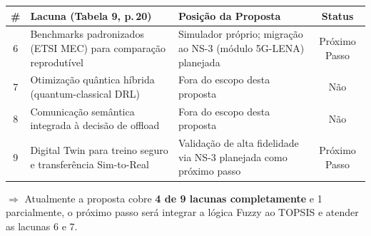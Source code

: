 \documentclass{beamer}
\begin{document}
{
\begin{frame}[plain, t]
\color{black}
\vspace{0.15cm}
\hspace{0.3cm}{\large\bfseries\ttfamily LACUNAS NÃO COBERTAS --- DIREÇÕES FUTURAS [Miriyala \& Chirra, 2026]}
\vspace{0.20cm}

\hspace{0.3cm}\begin{minipage}{0.93\textwidth}
{\scriptsize\ttfamily

\begin{tabular}{@{}c|p{4.0cm}|p{4.6cm}|c@{}}
\textbf{\#} & \textbf{Lacuna (Tabela 9, p.\,20)} & \textbf{Posição da Proposta} & \textbf{Status} \\
\hline\noalign{\vspace{3pt}}
6 & Benchmarks padronizados (ETSI MEC) para comparação reprodutível &
  Simulador próprio; migração ao NS-3 (módulo 5G-LENA) planejada &
  Próximo Passo \\[4pt]
7 & Otimização quântica híbrida (quantum-classical DRL) &
  Fora do escopo desta proposta &
  Não \\[4pt]
8 & Comunicação semântica integrada à decisão de offload &
  Fora do escopo desta proposta &
  Não \\[4pt]
9 & Digital Twin para treino seguro e transferência Sim-to-Real &
  Validação de alta fidelidade via NS-3 planejada como próximo passo &
  Próximo Passo \\
\end{tabular}

\vspace{8pt}
$\Rightarrow$ Atualmente a proposta cobre \textbf{4 de 9 lacunas completamente} e 1 parcialmente, o próximo passo será integrar a lógica Fuzzy ao TOPSIS e atender as lacunas 6 e 7.
}
\end{minipage}
\end{frame}
}
\end{document}
